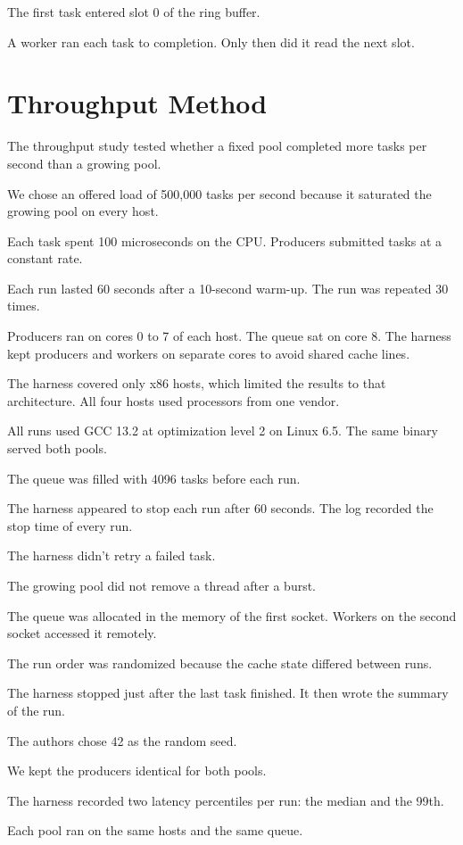 The first task entered slot 0 of the ring buffer.

A worker ran each task to completion. Only then did it read the next slot.

\section{Throughput Method}

The throughput study tested whether a fixed pool completed more tasks per second than a growing pool.

We chose an offered load of 500,000 tasks per second because it saturated the growing pool on every host.

Each task spent 100 microseconds on the CPU. Producers submitted tasks at a constant rate.

Each run lasted 60 seconds after a 10-second warm-up. The run was repeated 30 times.

Producers ran on cores 0 to 7 of each host. The queue sat on core 8. The harness kept producers and workers on separate cores to avoid shared cache lines.

The harness covered only x86 hosts, which limited the results to that architecture. All four hosts used processors from one vendor.

All runs used GCC 13.2 at optimization level 2 on Linux 6.5. The same binary served both pools.

The queue was filled with 4096 tasks before each run.

The harness appeared to stop each run after 60 seconds. The log recorded the stop time of every run.

The harness didn't retry a failed task.

The growing pool did not remove a thread after a burst.

The queue was allocated in the memory of the first socket. Workers on the second socket accessed it remotely.

The run order was randomized because the cache state differed between runs.

The harness stopped just after the last task finished. It then wrote the summary of the run.

The authors chose 42 as the random seed.

We kept the producers identical for both pools.

The harness recorded two latency percentiles per run: the median and the 99th.

Each pool ran on the same hosts and the same queue.

